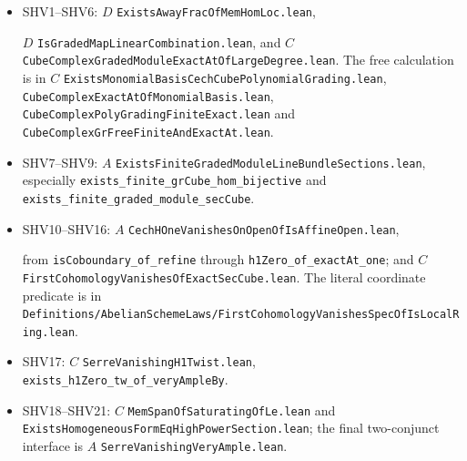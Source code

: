 \begin{itemize}
\item SHV1--SHV6: $D$ \texttt{Exists\allowbreak{}Away\allowbreak{}Frac\allowbreak{}Of\allowbreak{}Mem\allowbreak{}Hom\allowbreak{}Loc.lean},\par
$D$ \texttt{Is\allowbreak{}Graded\allowbreak{}Map\allowbreak{}Linear\allowbreak{}Combination.lean}, and
$C$ \texttt{Cube\allowbreak{}Complex\allowbreak{}Graded\allowbreak{}Module\allowbreak{}Exact\allowbreak{}At\allowbreak{}Of\allowbreak{}Large\allowbreak{}Degree.lean}.
The free calculation is in
$C$ \texttt{Exists\allowbreak{}Monomial\allowbreak{}Basis\allowbreak{}Cech\allowbreak{}Cube\allowbreak{}Polynomial\allowbreak{}Grading.lean},
\texttt{Cube\allowbreak{}Complex\allowbreak{}Exact\allowbreak{}At\allowbreak{}Of\allowbreak{}Monomial\allowbreak{}Basis.lean},
\texttt{Cube\allowbreak{}Complex\allowbreak{}Poly\allowbreak{}Grading\allowbreak{}Finite\allowbreak{}Exact.lean} and
\texttt{Cube\allowbreak{}Complex\allowbreak{}Gr\allowbreak{}Free\allowbreak{}Finite\allowbreak{}And\allowbreak{}Exact\allowbreak{}At.lean}.
\item SHV7--SHV9: $A$
\texttt{Exists\allowbreak{}Finite\allowbreak{}Graded\allowbreak{}Module\allowbreak{}Line\allowbreak{}Bundle\allowbreak{}Sections.lean},
especially \texttt{exists\_\allowbreak{}finite\_\allowbreak{}gr\allowbreak{}Cube\_\allowbreak{}hom\_\allowbreak{}bijective} and
\texttt{exists\_\allowbreak{}finite\_\allowbreak{}graded\_\allowbreak{}module\_\allowbreak{}sec\allowbreak{}Cube}.
\item SHV10--SHV16: $A$
\texttt{Cech\allowbreak{}HOne\allowbreak{}Vanishes\allowbreak{}On\allowbreak{}Open\allowbreak{}Of\allowbreak{}Is\allowbreak{}Affine\allowbreak{}Open.lean},\par
from \texttt{is\allowbreak{}Coboundary\_\allowbreak{}of\_\allowbreak{}refine} through
\texttt{h1\allowbreak{}Zero\_\allowbreak{}of\_\allowbreak{}exact\allowbreak{}At\_\allowbreak{}one}; and $C$
\texttt{First\allowbreak{}Cohomology\allowbreak{}Vanishes\allowbreak{}Of\allowbreak{}Exact\allowbreak{}Sec\allowbreak{}Cube.lean}.
The literal coordinate predicate is in
\texttt{Definitions/\allowbreak{}Abelian\allowbreak{}Scheme\allowbreak{}Laws/\allowbreak{}First\allowbreak{}Cohomology\allowbreak{}Vanishes\allowbreak{}Spec\allowbreak{}Of\allowbreak{}Is\allowbreak{}Local\allowbreak{}Ring.lean}.
\item SHV17: $C$ \texttt{Serre\allowbreak{}Vanishing\allowbreak{}H1\allowbreak{}Twist.lean},
\texttt{exists\_\allowbreak{}h1\allowbreak{}Zero\_\allowbreak{}tw\_\allowbreak{}of\_\allowbreak{}very\allowbreak{}Ample\allowbreak{}By}.
\item SHV18--SHV21: $C$ \texttt{Mem\allowbreak{}Span\allowbreak{}Of\allowbreak{}Saturating\allowbreak{}Of\allowbreak{}Le.lean}
and \texttt{Exists\allowbreak{}Homogeneous\allowbreak{}Form\allowbreak{}Eq\allowbreak{}High\allowbreak{}Power\allowbreak{}Section.lean};
the final two-conjunct interface is $A$
\texttt{Serre\allowbreak{}Vanishing\allowbreak{}Very\allowbreak{}Ample.lean}.
\end{itemize}
